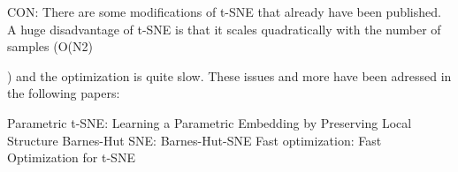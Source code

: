 \documentclass[journal, a4paper]{IEEEtran}
\begin{document}

%
%




CON: There are some modifications of t-SNE that already have been published. A huge disadvantage of t-SNE is that it scales quadratically with the number of samples (O(N2)

) and the optimization is quite slow. These issues and more have been adressed in the following papers:

Parametric t-SNE: Learning a Parametric Embedding by Preserving Local Structure
Barnes-Hut SNE: Barnes-Hut-SNE
Fast optimization: Fast Optimization for t-SNE
\end{document}

